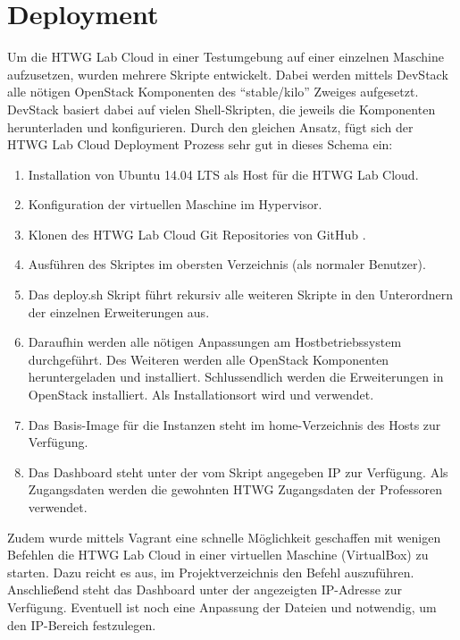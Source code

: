 \chapter{Deployment}

Um die HTWG Lab Cloud in einer Testumgebung auf einer einzelnen Maschine aufzusetzen, wurden mehrere  Skripte entwickelt.
Dabei werden mittels DevStack \cite{devstack} alle nötigen OpenStack Komponenten des \enquote{stable/kilo} Zweiges aufgesetzt.
DevStack basiert dabei auf vielen Shell-Skripten, die jeweils die Komponenten herunterladen und konfigurieren.
Durch den gleichen Ansatz, fügt sich der HTWG Lab Cloud Deployment Prozess sehr gut in dieses Schema ein:

\begin{enumerate}
\item Installation von Ubuntu 14.04 LTS als Host für die HTWG Lab Cloud.
\item Konfiguration der virtuellen Maschine im Hypervisor.
\item Klonen des HTWG Lab Cloud Git Repositories von GitHub \cite{git-source}.
\item Ausführen des  Skriptes im obersten Verzeichnis (als normaler Benutzer).
\item Das deploy.sh Skript führt rekursiv alle weiteren Skripte in den Unterordnern der einzelnen Erweiterungen aus.
\item Daraufhin werden alle nötigen Anpassungen am Hostbetriebssystem durchgeführt.  Des Weiteren werden alle OpenStack Komponenten heruntergeladen und installiert. Schlussendlich werden die Erweiterungen in OpenStack installiert. Als Installationsort wird  und  verwendet.
\item Das Basis-Image für die Instanzen steht im home-Verzeichnis des Hosts zur Verfügung.
\item Das Dashboard steht unter der vom Skript angegeben IP zur Verfügung. Als Zugangsdaten werden die gewohnten HTWG Zugangsdaten der Professoren verwendet.
\end{enumerate}

Zudem wurde mittels Vagrant \cite{Vagrant} eine schnelle Möglichkeit geschaffen mit wenigen Befehlen die HTWG Lab Cloud in einer virtuellen Maschine (VirtualBox) zu starten. 
Dazu reicht es aus, im Projektverzeichnis den Befehl  auszuführen.
Anschließend steht das Dashboard unter der angezeigten IP-Adresse zur Verfügung.
Eventuell ist noch eine Anpassung der Dateien  und  notwendig, um den IP-Bereich festzulegen.

